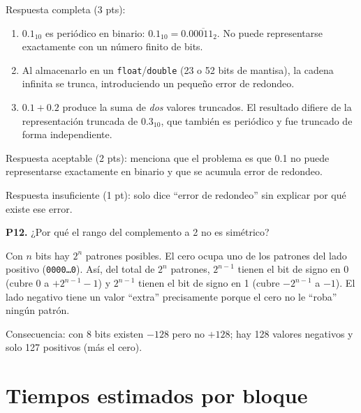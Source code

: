 \documentclass[12pt, oneside]{article}
\begin{document}
\begin{notaprofesor}
  Respuesta completa (3 pts):
  \begin{enumerate}
    \item $0.1_{10}$ es periódico en binario: $0.1_{10} = 0.0\overline{0011}_2$.
          No puede representarse exactamente con un número finito de bits.
    \item Al almacenarlo en un \texttt{float}/\texttt{double} (23 o 52 bits de mantisa),
          la cadena infinita se trunca, introduciendo un pequeño error de redondeo.
    \item $0.1 + 0.2$ produce la suma de \textit{dos} valores truncados.
          El resultado difiere de la representación truncada de $0.3_{10}$,
          que también es periódico y fue truncado de forma independiente.
  \end{enumerate}

  Respuesta aceptable (2 pts): menciona que el problema es que 0.1 no puede
  representarse exactamente en binario y que se acumula error de redondeo.

  Respuesta insuficiente (1 pt): solo dice ``error de redondeo'' sin explicar
  por qué existe ese error.
\end{notaprofesor}

\medskip
\textbf{P12.} ¿Por qué el rango del complemento a 2 no es simétrico?

\begin{notaprofesor}
  Con $n$ bits hay $2^n$ patrones posibles.
  El cero ocupa uno de los patrones del lado positivo
  (\texttt{0000\ldots0}).  Así, del total de $2^n$ patrones,
  $2^{n-1}$ tienen el bit de signo en 0 (cubre 0 a $+2^{n-1}-1$)
  y $2^{n-1}$ tienen el bit de signo en 1 (cubre $-2^{n-1}$ a $-1$).
  El lado negativo tiene un valor ``extra'' precisamente porque el cero
  no le ``roba'' ningún patrón.

  Consecuencia: con 8 bits existen $-128$ pero no $+128$;
  hay 128 valores negativos y solo 127 positivos (más el cero).
\end{notaprofesor}

\newpage

\section{Tiempos estimados por bloque}
\end{document}
